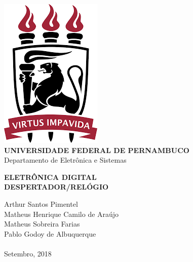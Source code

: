 \documentclass[14pt, oneside]{book}
\date{\vspace{-5ex}}
\theoremstyle{definition}
\begin{document}

    \begin{titlepage}
        \centering 
        \includegraphics[scale = 0.8]{ufpe.png} \\
        \Large{\textbf{UNIVERSIDADE FEDERAL DE PERNAMBUCO}}\\
        \large{Departamento de Eletrônica e Sistemas}
   
        \Huge\textbf{ELETRÔNICA DIGITAL}\\
        \Large\textbf{DESPERTADOR/RELÓGIO}
   
        \vfill
        \Large{Arthur Santos Pimentel} \\
        \Large{Matheus Henrique Camilo de Araújo} \\
        \Large{Matheus Sobreira Farias} \\
        \Large{Pablo Godoy de Albuquerque}
        \\~\\
        \Large{Setembro, 2018}
    \end{titlepage}

\tableofcontents
\mainmatter
\end{document}
